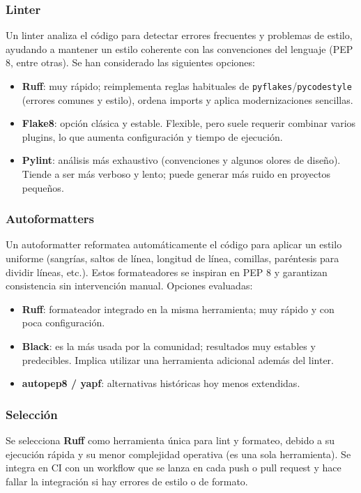 \subsubsection{Linter}
Un linter analiza el código para detectar errores frecuentes y problemas de estilo, ayudando a
mantener un estilo coherente con las convenciones del lenguaje (PEP 8, entre otras).
Se han considerado las siguientes opciones:

\begin{itemize}
  \item \textbf{Ruff}: muy rápido; reimplementa reglas habituales de \texttt{pyflakes}/\texttt{pycodestyle}
  (errores comunes y estilo), ordena imports y aplica modernizaciones sencillas.
  \item \textbf{Flake8}: opción clásica y estable. Flexible, pero suele requerir combinar
  varios plugins, lo que aumenta configuración y tiempo de ejecución.
  \item \textbf{Pylint}: análisis más exhaustivo (convenciones y algunos olores de diseño). Tiende a ser
  más verboso y lento; puede generar más ruido en proyectos pequeños.
\end{itemize}

\subsubsection{Autoformatters}
Un autoformatter reformatea automáticamente el código para aplicar un estilo uniforme
(sangrías, saltos de línea, longitud de línea, comillas, paréntesis para dividir líneas, etc.).
Estos formateadores se inspiran en PEP 8 y garantizan consistencia sin intervención manual.
Opciones evaluadas:

\begin{itemize}
  \item \textbf{Ruff}: formateador integrado en la misma herramienta; muy rápido y con poca configuración.
  \item \textbf{Black}: es la más usada por la comunidad; resultados muy estables y predecibles. Implica 
  utilizar una herramienta adicional además del linter.
  \item \textbf{autopep8 / yapf}: alternativas históricas hoy menos extendidas.
\end{itemize}

\subsubsection{Selección}
Se selecciona \textbf{Ruff} como herramienta única para lint y formateo, debido a su ejecución rápida y su menor 
complejidad operativa (es una sola herramienta).
Se integra en CI con un workflow que se lanza en cada push o pull request y hace fallar la integración si hay 
errores de estilo o de formato.